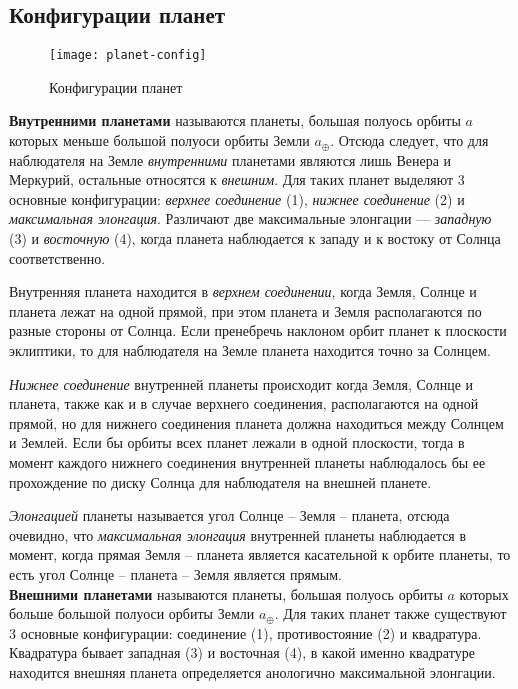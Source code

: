 \subsection{Конфигурации планет}

\begin{figure}[h!]
\centering
\texttt{[image: planet-config]}
\caption{Конфигурации планет}
\end{figure}

{\bfseries Внутренними планетами} называются планеты, 
большая полуось орбиты $a$ которых меньше большой 
полуоси орбиты Земли $a_\oplus$. Отсюда следует, что 
для наблюдателя на Земле {\itshape внутренними} 
планетами являются лишь Венера и Меркурий, остальные 
относятся к {\itshape внешним}. Для таких планет 
выделяют 3 основные конфигурации: {\itshape верхнее 
соединение} (1), {\itshape нижнее соединение} (2) и 
{\itshape максимальная элонгация}. Различают две 
максимальные элонгации --- {\itshape западную} (3) и 
{\itshape восточную} (4), когда планета наблюдается к 
западу и к востоку от Солнца соответственно.

Внутренняя планета находится в {\itshape верхнем 
соединении}, когда Земля, Солнце и планета лежат на 
одной прямой, при этом планета и Земля располагаются 
по разные стороны от Солнца. Если пренебречь наклоном 
орбит планет к плоскости эклиптики, то для 
наблюдателя на Земле планета находится точно за Солнцем.

{\itshape Нижнее соединение} внутренней планеты 
происходит когда Земля, Солнце и планета, также как и 
в случае верхнего соединения, располагаются на одной 
прямой, но для нижнего соединения планета должна 
находиться между Солнцем и Землей. Если бы орбиты всех 
планет лежали в одной плоскости, тогда в момент каждого 
нижнего соединения внутренней планеты наблюдалось бы 
ее прохождение по диску Солнца для наблюдателя на 
внешней планете.

{\itshape Элонгацией} планеты называется угол Солнце 
-- Земля -- планета, отсюда очевидно, что {\itshape 
максимальная элонгация} внутренней планеты наблюдается 
в момент, когда прямая Земля -- планета является 
касательной к орбите планеты, то есть угол Солнце -- 
планета -- Земля является прямым.\\

{\bfseries Внешними планетами} называются планеты, 
большая полуось орбиты $a$ которых больше большой 
полуоси орбиты Земли $a_\oplus$. Для таких планет 
также существуют 3 основные конфигурации: соединение 
(1), противостояние (2) и квадратура. Квадратура 
бывает западная (3) и восточная (4), в какой именно 
квадратуре находится внешняя планета определяется 
анологично максимальной элонгации.

